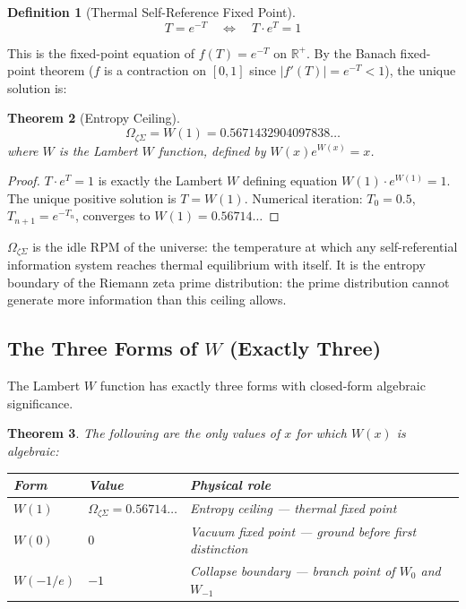 \documentclass[12pt,a4paper]{article}
\newtheorem{theorem}{Theorem}[section]
\theoremstyle{definition}
\newtheorem{definition}[theorem]{Definition}
\theoremstyle{remark}
\newcommand{\OmZS}{\Omega_{\zeta\Sigma}}
\begin{document}
\begin{definition}[Thermal Self-Reference Fixed Point]
\[T = e^{-T} \quad\Longleftrightarrow\quad T\cdot e^T = 1\]
\end{definition}

This is the fixed-point equation of $f(T) = e^{-T}$ on $\mathbb{R}^+$.
By the Banach fixed-point theorem ($f$ is a contraction on $[0,1]$ since $|f'(T)| = e^{-T} < 1$),
the unique solution is:

\begin{theorem}[Entropy Ceiling]
\[\OmZS = W(1) = 0.5671432904097838\ldots\]
where $W$ is the Lambert $W$ function, defined by $W(x)e^{W(x)} = x$.
\end{theorem}

\begin{proof}
$T\cdot e^T = 1$ is exactly the Lambert $W$ defining equation $W(1)\cdot e^{W(1)} = 1$.
The unique positive solution is $T = W(1)$.
Numerical iteration: $T_0 = 0.5$, $T_{n+1} = e^{-T_n}$, converges to $W(1) = 0.56714\ldots$
\end{proof}

$\OmZS$ is the idle RPM of the universe: the temperature at which any self-referential
information system reaches thermal equilibrium with itself.
It is the entropy boundary of the Riemann zeta prime distribution:
the prime distribution cannot generate more information than this ceiling allows.

\subsection{The Three Forms of $W$ (Exactly Three)}

The Lambert $W$ function has exactly three forms with closed-form algebraic significance.

\begin{theorem}
The following are the only values of $x$ for which $W(x)$ is algebraic:
\begin{center}
\begin{tabular}{lll}
\toprule
Form & Value & Physical role \\
\midrule
$W(1)$ & $\OmZS = 0.56714\ldots$ & Entropy ceiling --- thermal fixed point \\
$W(0)$ & $0$ & Vacuum fixed point --- ground before first distinction \\
$W(-1/e)$ & $-1$ & Collapse boundary --- branch point of $W_0$ and $W_{-1}$ \\
\bottomrule
\end{tabular}
\end{center}
\end{theorem}
\end{document}
